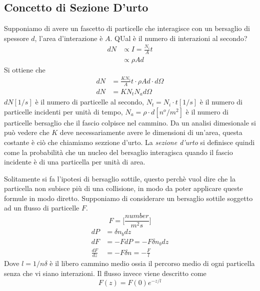 \subsection{Concetto di Sezione D'urto}
Supponiamo di avere un fascetto di particelle che interagisce con un bersaglio di spessore $d$, l'area d'interazione è $A$.
QUal è il numero di interazioni al secondo?
\begin{equation}
\begin{split}
dN &\propto I=\frac{N_i}{A}t\\
&\propto \rho A d
\end{split}
\end{equation}
Si ottiene che 
\begin{equation}
\begin{split}
dN &=\frac{KN_i}{A}t\cdot\rho Ad\cdot d\Omega\\
dN &=KN_tN_ad\Omega
\end{split}
\end{equation}
$dN [1/s]$ è il numero di particelle al secondo, $N_t=N_i\cdot t [1/s]$ è il numero di particelle incidenti per unità di tempo, $N_a=\rho \cdot d[n^o/m^2]$ è il numero di particelle bersaglio che il fascio colpisce nel cammino.
Da un analisi dimesionale si può vedere che $K$ deve necessariamente avere le dimensioni di un'area, questa costante è ciò che chiamiamo sezzione d'urto.
La \emph{sezione d'urto} si definisce quindi come la probabilità che un nucleo del bersaglio interagisca quando il fascio incidente è di una particella per unità di area.

Solitamente si fa l'ipotesi di bersaglio sottile, questo perchè vuol dire che la particella non subisce più di una collisione, in modo da poter applicare queste formule in modo diretto.
Supponiamo di considerare un bersaglio sottile soggetto ad un flusso di particelle $F$.
\begin{equation}
F=\biggl[\frac{number}{m^2 s}\biggl]
\end{equation}
\begin{equation}
\begin{split}
dP&=\delta n_b dz\\
dF&=-FdP=-F\delta n_b dz\\
\frac{dF}{dz}&=-F\delta n=-\frac{F}{l}
\end{split}
\end{equation}
Dove $l=1/n\delta$ è il libero cammino medio ossia il percorso medio di ogni particella senza che vi siano interazioni.
Il flusso invece viene descritto come
\begin{equation}
F(z)=F(0)e^{-z/l}
\end{equation}


